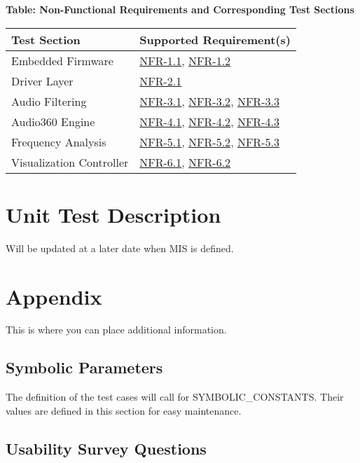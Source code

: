 \documentclass[12pt, titlepage]{article}
\begin{document}
\noindent
\textbf{Table: Non-Functional Requirements and Corresponding Test Sections}

\noindent
\begin{tabular}{|l|l|}
\hline
\textbf{Test Section} & \textbf{Supported Requirement(s)} \\ \hline
Embedded Firmware & \hyperref[SRS-NFR1_1]{NFR-1.1},
\hyperref[SRS-NFR1_2]{NFR-1.2} \\ \hline
Driver Layer & \hyperref[SRS-NFR2_1]{NFR-2.1} \\ \hline
Audio Filtering & \hyperref[SRS-NFR3_1]{NFR-3.1},
\hyperref[SRS-NFR3_2]{NFR-3.2}, \hyperref[SRS-NFR3_3]{NFR-3.3} \\ \hline
Audio360 Engine & \hyperref[SRS-NFR4_1]{NFR-4.1},
\hyperref[SRS-NFR4_2]{NFR-4.2}, \hyperref[SRS-NFR4_3]{NFR-4.3} \\ \hline
Frequency Analysis & \hyperref[SRS-NFR5_1]{NFR-5.1},
\hyperref[SRS-NFR5_2]{NFR-5.2}, \hyperref[SRS-NFR5_3]{NFR-5.3} \\ \hline
Visualization Controller & \hyperref[SRS-NFR6_1]{NFR-6.1},
\hyperref[SRS-NFR6_2]{NFR-6.2} \\ \hline
\end{tabular}

\section{Unit Test Description}

Will be updated at a later date when MIS is defined.



\newpage

\section{Appendix}

This is where you can place additional information.

\subsection{Symbolic Parameters}

The definition of the test cases will call for SYMBOLIC\_CONSTANTS. Their values
are defined in this section for easy maintenance.

\subsection{Usability Survey Questions}
\end{document}
